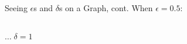\documentclass[cal1spr16Lectures.tex]{subfiles}
\begin{document}
\begin{frame}{\small Seeing $\epsilon$s and $\delta$s on a Graph, cont.}\footnotesize
When $\epsilon=0.5$:
\vspace{-0.25pc}
\begin{columns}
\begin{column}{.36\textwidth}
\begin{block}
\end{block}
\end{column}
\begin{column}{.36\textwidth}
\begin{block}
\end{block}
\end{column}
\end{columns}
\vspace{-0.75pc}
\flushright $\dots\;\delta=1$
\end{frame}
\end{document}
